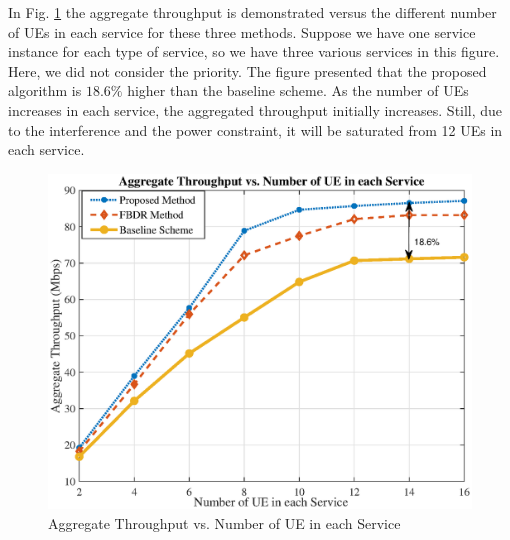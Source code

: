 \documentclass[conference]{IEEEtran}
\begin{document}
In Fig. \ref{fig:1} the aggregate throughput is demonstrated versus the different number of UEs in each service for these three methods. Suppose we have one service instance for each type of service, so we have three various services in this figure.
Here, we did not consider the priority. The figure presented that the proposed algorithm is $18.6\%$ higher than the baseline scheme.
As the number of UEs increases in each service, the aggregated throughput initially increases. Still, due to the interference and the power constraint, it will be saturated from 12 UEs in each service.
\begin{figure}
  \centering 
    \includegraphics[scale = 0.5]{rate_ue1.eps}
  \caption{Aggregate Throughput vs. Number of UE in each Service }
  \label{fig:1}
\end{figure}
\end{document}
